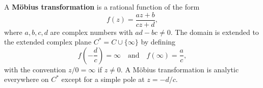A \textbf{Möbius transformation} is a rational function of the form
$$f(z) = \frac{az + b}{cz + d},$$
where $a, b, c, d$ are complex numbers with $ad - bc \neq 0$. The domain is extended to the extended complex plane $C^* = C \cup \{\infty\}$ by defining
$$f\!\left(-\frac{d}{c}\right) = \infty \quad \text{and} \quad f(\infty) = \frac{a}{c},$$
with the convention $z/0 = \infty$ if $z \neq 0$. A Möbius transformation is analytic everywhere on $C^*$ except for a simple pole at $z = -d/c$.
